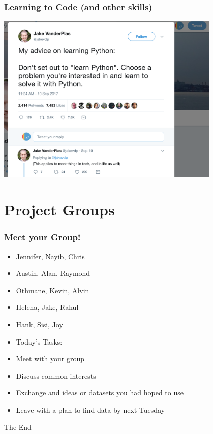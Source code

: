 \documentclass[14pt]{beamer}
\begin{document}
\begin{frame}
\frametitle{Learning to Code (and other skills)}
\centerline{\includegraphics[width=0.8\textwidth]{images_20170912_skills.png}}
\end{frame}

\section{Project Groups}

\begin{frame}
\frametitle{Meet your Group!}
	\begin{itemize}
	\item<1-> Jennifer, Nayib, Chris
	\item<2-> Austin, Alan, Raymond
	\item<3-> Othmane, Kevin, Alvin
	\item<4-> Helena, Jake, Rahul
	\item<5-> Hank, Sisi, Joy
	\end{itemize}
\end{frame}

\begin{frame}
	\begin{itemize}
		\item<+-> {\Large Today's Tasks:}
		\item<+-> Meet with your group
		\item<+-> Discuss common interests
		\item<+-> Exchange and ideas or datasets you had hoped to use
		\item<+-> Leave with a plan to find data by next Tuesday
	\end{itemize}
\end{frame}


\begin{frame}
\Huge{\centerline{The End}}
\end{frame}

\end{document}
